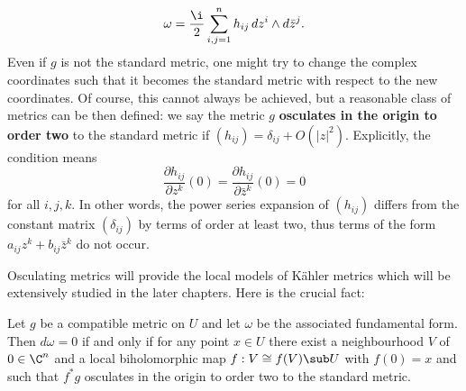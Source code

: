 \begin{align}\label{complex manifold fundamental on C^n express}
\omega=\frac{\i}{2}\sum_{i,j=1}^{n}h_{ij}\,dz^i\wedge d\bar{z}^j.
\end{align}
Even if $g$ is not the standard metric, one might try to change the complex coordinates such that it becomes the standard metric with respect to the new coordinates. Of course, this cannot always be achieved, but a reasonable class of metrics can be then defined: we say the metric $g$ \textbf{osculates in the origin to order two} to the standard metric if $(h_{ij})=\delta_{ij}+O(|z|^2)$. Explicitly, the condition means 
\[\frac{\partial h_{ij}}{\partial z^k}(0)=\frac{\partial h_{ij}}{\partial\bar{z}^k}(0)=0\]
for all $i,j,k$. In other words, the power series expansion of $(h_{ij})$ differs from the constant matrix $(\delta_{ij})$ by terms of order at least two, thus terms of the form $a_{ij}z^k+b_{ij}\bar{z}^k$ do not occur.\par
Osculating metrics will provide the local models of K\"ahler metrics which will be extensively studied in the later chapters. Here is the crucial fact:
\begin{proposition}\label{complex manifold metric on C^n Kahler iff two order}
Let $g$ be a compatible metric on $U$ and let $\omega$ be the associated fundamental form. Then $d\omega=0$ if and only if for any point $x\in U$ there exist a neighbourhood $V$ of $0\in\C^n$ and a local biholomorphic map $f:V\cong f(V)\sub U$ with $f(0) =x$ and such that $f^*g$ osculates in the origin to order two to the standard metric.
\end{proposition}
